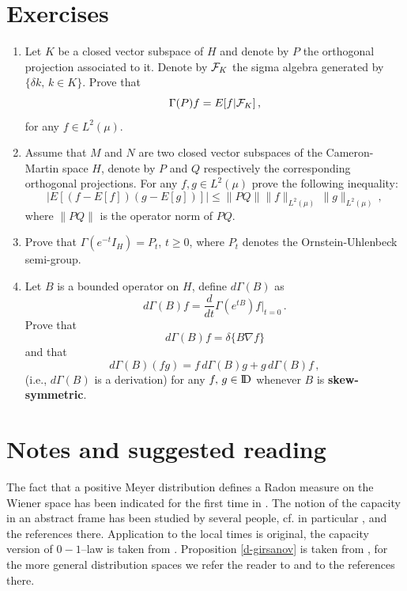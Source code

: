 \documentclass[12pt,a4paper]{book}
\newcommand{\DD}{{\rm I\!D}}
\newcommand{\calF}{{\cal F}}
\begin{document}
\section{Exercises}
{\footnotesize{
\begin{enumerate}
\item Let $K$ be a closed vector subspace of $H$ and denote by $P$ the
  orthogonal projection associated to it. Denote by $\calF_K$ the
  sigma algebra generated by $\{\delta k,\,k\in K\}$. Prove that
$$
\Gamma(P)f=E[f|\calF_K]\,,
$$
for any $f\in L^2(\mu)$.
\item Assume that $M$ and $N$ are two closed  vector subspaces of the 
Cameron-Martin space $H$, denote by $P$ and $Q$ respectively the 
corresponding orthogonal projections. For any $f,g\in L^2(\mu)$ prove the 
following inequality:
$$
\left|E\left[(f-E[f])(g-E[g])\right]\right|\leq 
\|PQ\|\|f\|_{L^2(\mu)}\,\|g\|_{L^2(\mu)}\,,
$$
where $\|PQ\|$ is the operator norm of $PQ$.


\item Prove that $\Gamma(e^{-t}I_H)=P_t$, $t\geq 0$, where $P_t$ denotes
the Ornstein-Uhlenbeck semi-group.
\item Let $B$ is a bounded operator on $H$, define $d\Gamma(B)$ as
$$
d\Gamma(B)f=\frac{d}{dt}\Gamma(e^{tB})f|_{t=0}\,.
$$
Prove that
$$
d\Gamma(B)f=\delta\{ B\nabla f\}
$$
and that
$$
d\Gamma(B)(fg)=f\,d\Gamma(B) g+g\,d\Gamma(B) f\,,
$$
(i.e., $d\Gamma(B)$ is a derivation)
for any $f,\,g\in \DD$ whenever $B$ is {\bf{skew-symmetric}}.
\end{enumerate}
}}


\section*{Notes and suggested reading}
{\footnotesize{
The fact that a positive Meyer distribution defines a Radon measure on
the Wiener space has been indicated for the first time in
\cite{Mal}. The notion of the capacity in an abstract frame has been
studied by several people, cf. in particular \cite{B-H},
\cite{Mall-1} and the references there. Application  to the local times
is original, the capacity version of $0-1$--law is taken from
\cite{Kus1}. Proposition \ref{d-girsanov} is taken from \cite{KU}, for
the more general distribution spaces we refer the
reader to \cite{KU, K-T, M-Y} and to the references there.
}}
\end{document}

